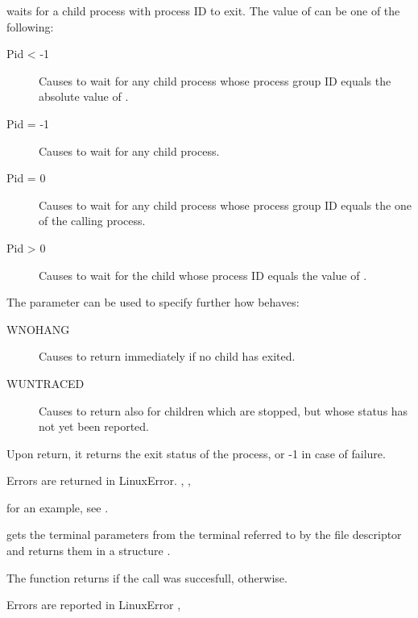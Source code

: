 {  waits for a child process with process ID  to exit. The
value of  can be one of the following:
\begin{description}
\item[Pid < -1] Causes  to wait for  any  child  process  whose
              process group ID equals the absolute value of .

\item[Pid = -1] Causes  to wait for any child process.

\item[Pid = 0] Causes  to wait for  any  child  process  whose
              process  group  ID  equals the one of the calling
              process.

\item[Pid > 0] Causes  to wait for the child whose process  ID
equals the value of .
\end{description}
The  parameter can be used to specify further how 
behaves:
\begin{description}
\item [WNOHANG] Causes  to return immediately if no child  has
exited.
\item [WUNTRACED] Causes  to return also for children which are
stopped, but whose status has not yet been reported.
\end{description} 

Upon return, it returns the exit status of the process, or -1 in case of
failure. 
}
{Errors are returned in LinuxError.}
{, , }

for an example, see .

{ 
  gets the terminal parameters from the terminal referred to by the file
  descriptor  and returns them in a  structure . 

The function returns  if the call was succesfull, 
otherwise.
}
{Errors are reported in LinuxError}
{,  }



